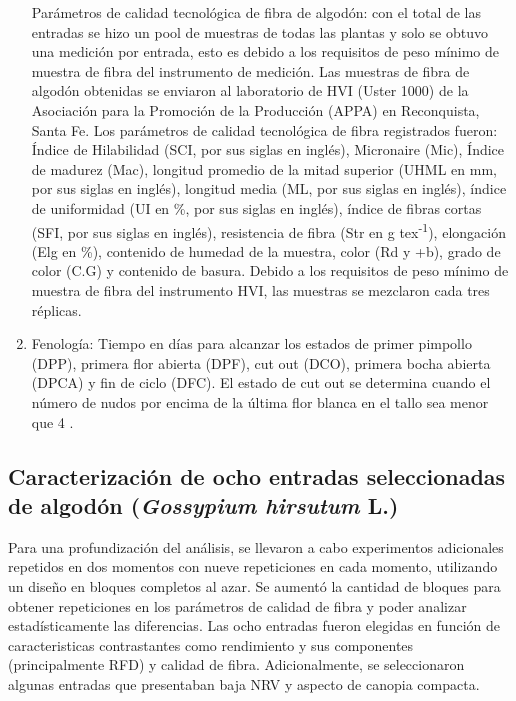 \documentclass[12pt,oneside]{reedthesis}
\begin{document}
\begin{enumerate}
  Parámetros de calidad tecnológica de fibra de algodón: con el total de las entradas se hizo un pool de muestras de todas las plantas y solo se obtuvo una medición por entrada, esto es debido a los requisitos de peso mínimo de muestra de fibra del instrumento de medición. Las muestras de fibra de algodón obtenidas se enviaron al laboratorio de HVI (Uster 1000) de la Asociación para la Promoción de la Producción (APPA) en Reconquista, Santa Fe. Los parámetros de calidad tecnológica de fibra registrados fueron: Índice de Hilabilidad (SCI, por sus siglas en inglés), Micronaire (Mic), Índice de madurez (Mac), longitud promedio de la mitad superior (UHML en mm, por sus siglas en inglés), longitud media (ML, por sus siglas en inglés), índice de uniformidad (UI en \%, por sus siglas en inglés), índice de fibras cortas (SFI, por sus siglas en inglés), resistencia de fibra (Str en g tex\textsuperscript{-1}), elongación (Elg en \%), contenido de humedad de la muestra, color (Rd y +b), grado de color (C.G) y contenido de basura. Debido a los requisitos de peso mínimo de muestra de fibra del instrumento HVI, las muestras se mezclaron cada tres réplicas.
\item
  Fenología: Tiempo en días para alcanzar los estados de primer pimpollo (DPP), primera flor abierta (DPF), cut out (DCO), primera bocha abierta (DPCA) y fin de ciclo (DFC). El estado de cut out se determina cuando el número de nudos por encima de la última flor blanca en el tallo sea menor que 4 \autocite{bourland1992}.
\end{enumerate}

\subsection{\texorpdfstring{Caracterización de ocho entradas seleccionadas de algodón (\emph{Gossypium hirsutum} L.)}{Caracterización de ocho entradas seleccionadas de algodón (Gossypium hirsutum L.)}}\label{caracterizaciuxf3n-de-ocho-entradas-seleccionadas-de-algoduxf3n-gossypium-hirsutum-l.}

Para una profundización del análisis, se llevaron a cabo experimentos adicionales repetidos en dos momentos con nueve repeticiones en cada momento, utilizando un diseño en bloques completos al azar. Se aumentó la cantidad de bloques para obtener repeticiones en los parámetros de calidad de fibra y poder analizar estadísticamente las diferencias. Las ocho entradas fueron elegidas en función de caracteristicas contrastantes como rendimiento y sus componentes (principalmente RFD) y calidad de fibra. Adicionalmente, se seleccionaron algunas entradas que presentaban baja NRV y aspecto de canopia compacta.
\end{document}
